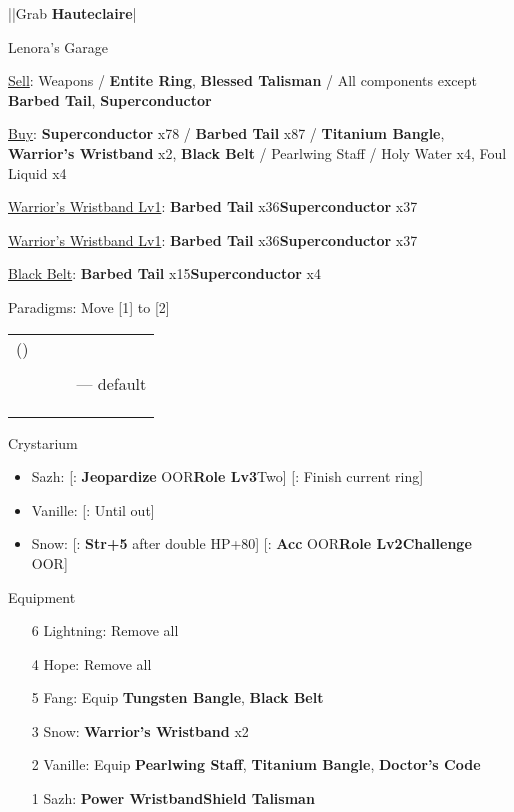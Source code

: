 \begin{mainlist}
	\item \skip|\skip|Grab \textbf{Hauteclaire}|\skip
\end{mainlist}
\begin{shop}{Lenora's Garage}
	\item \underline{Sell}: Weapons / \textbf{Entite Ring}, \textbf{Blessed Talisman} / All components except \textbf{Barbed Tail}, \textbf{Superconductor}
	\item \underline{Buy}: \textbf{Superconductor} x78 / \textbf{Barbed Tail} x87 / \textbf{Titanium Bangle}, \textbf{Warrior's Wristband} x2, \textbf{Black Belt} / Pearlwing Staff / Holy Water x4, Foul Liquid x4
\end{shop}
\begin{upgrade}
	\item \underline{Warrior's Wristband Lv1}: \textbf{Barbed Tail} x36\to \textbf{Superconductor} x37
	\item \underline{Warrior's Wristband Lv1}: \textbf{Barbed Tail} x36\to \textbf{Superconductor} x37
	\item \underline{Black Belt}: \textbf{Barbed Tail} x15\to \textbf{Superconductor} x4
\end{upgrade}
\begin{menu}
	\item Paradigms: Move [1] to [2]
	\begin{tabular}{cccl}
		(\syn) & \sab & \rav &             \\
		\com   & \med & \com &             \\
		\syn   & \med & \com & --- default \\
		\com   & \sab & \com &             \\
		\syn   & \sab & \com &             \\
		\com   & \rav & \com &
	\end{tabular}
	\item Crystarium
	\begin{itemize}
		\item Sazh: [\com: \textbf{Jeopardize} OOR\to \textbf{Role Lv3}\to Two] [\rav: Finish current ring]
		\item Vanille: [\med: Until out]
		\item Snow: [\rav: \textbf{Str+5} after double HP+80] [\sen: \textbf{Acc} OOR\to \textbf{Role Lv2}\to \textbf{Challenge} OOR]
	\end{itemize}
	\item Equipment
	\begin{itemize}
		\item [6] Lightning: Remove all
		\item [4] Hope: Remove all
		\item [5] Fang: Equip \textbf{Tungsten Bangle}, \textbf{Black Belt}
		\item [3] Snow: \textbf{Warrior's Wristband\star} x2
		\item [2] Vanille: Equip \textbf{Pearlwing Staff}, \textbf{Titanium Bangle}, \textbf{Doctor's Code}
		\item [1] Sazh: \textbf{Power Wristband}\to \textbf{Shield Talisman}
	\end{itemize}
\end{menu}
